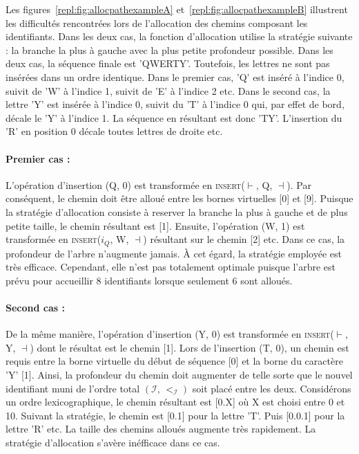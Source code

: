 Les figures~\ref{repl:fig:allocpathexampleA} et~\ref{repl:fig:allocpathexampleB}
illustrent les difficultés rencontrées lors de l'allocation des chemins
composant les identifiants. Dans les deux cas, la fonction d'allocation utilise
la stratégie suivante : la branche la plus à gauche avec la plus petite
profondeur possible. Dans les deux cas, la séquence finale est
'QWERTY'. Toutefois, les lettres ne sont pas insérées dans un ordre
identique. Dans le premier cas, 'Q' est inséré à l'indice 0, suivit de 'W' à
l'indice 1, suivit de 'E' à l'indice 2 etc.  Dans le second cas, la lettre 'Y'
est insérée à l'indice 0, suivit du 'T' à l'indice 0 qui, par effet de bord,
décale le 'Y' à l'indice 1. La séquence en résultant est donc 'TY'. L'insertion
du 'R' en position 0 décale toutes lettres de droite etc.


\paragraph{Premier cas :} L'opération d'insertion (Q, 0) est transformée en
\textsc{insert}($\vdash$, Q, $\dashv$). Par conséquent, le chemin doit être
alloué entre les bornes virtuelles [0] et [9]. Puisque la stratégie d'allocation
consiste à reserver la branche la plus à gauche et de plus petite taille, le
chemin résultant est [1]. Ensuite, l'opération (W, 1) est transformée en
\textsc{insert}($i_Q$, W, $\dashv$) résultant sur le chemin [2] etc.  Dans ce
cas, la profondeur de l'arbre n'augmente jamais. À cet égard, la stratégie
employée est très efficace. Cependant, elle n'est pas totalement optimale
puisque l'arbre est prévu pour accueillir 8 identifiants lorsque seulement 6
sont alloués.


\paragraph{Second cas :} De la même manière, l'opération d'insertion (Y, 0) est
transformée en \textsc{insert}($\vdash$, Y, $\dashv$) dont le résultat est le
chemin [1]. Lors de l'insertion (T, 0), un chemin est requis entre la borne
virtuelle du début de séquence [0] et la borne du caractère 'Y' [1]. Ainsi, la
profondeur du chemin doit augmenter de telle sorte que le nouvel identifiant
muni de l'ordre total $(\mathcal{I},\,<_\mathcal{I})$ soit placé entre les
deux. Considérons un ordre lexicographique, le chemin résultant est [0.X] où X
est choisi entre 0 et 10. Suivant la stratégie, le chemin est [0.1] pour la
lettre 'T'. Puis [0.0.1] pour la lettre 'R' etc. La taille des chemins alloués
augmente très rapidement.  La stratégie d'allocation s'avère inéfficace dans ce
cas.

